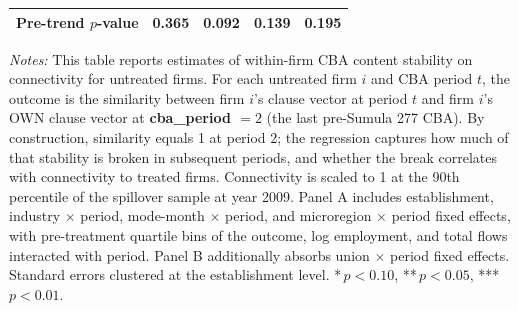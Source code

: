\begin{table}[H]
\begin{tabular}{lcccc}
Pre-trend $p$-value & 0.365 & 0.092 & 0.139 & 0.195 \\
\hline\hline
\end{tabular}
\begin{minipage}{\linewidth}
\smallskip
\scriptsize\textit{Notes:} This table reports estimates of within-firm CBA content stability on connectivity for untreated firms. For each untreated firm $i$ and CBA period $t$, the outcome is the similarity between firm $i$'s clause vector at period $t$ and firm $i$'s OWN clause vector at \textbf{cba\_period $= 2$} (the last pre-Sumula 277 CBA). By construction, similarity equals 1 at period 2; the regression captures how much of that stability is broken in subsequent periods, and whether the break correlates with connectivity to treated firms. Connectivity is scaled to 1 at the 90th percentile of the spillover sample at year 2009. Panel A includes establishment, industry $\times$ period, mode-month $\times$ period, and microregion $\times$ period fixed effects, with pre-treatment quartile bins of the outcome, log employment, and total flows interacted with period. Panel B additionally absorbs union $\times$ period fixed effects. Standard errors clustered at the establishment level. *\,$p<0.10$, **\,$p<0.05$, ***\,$p<0.01$.
\end{minipage}
\end{table}
